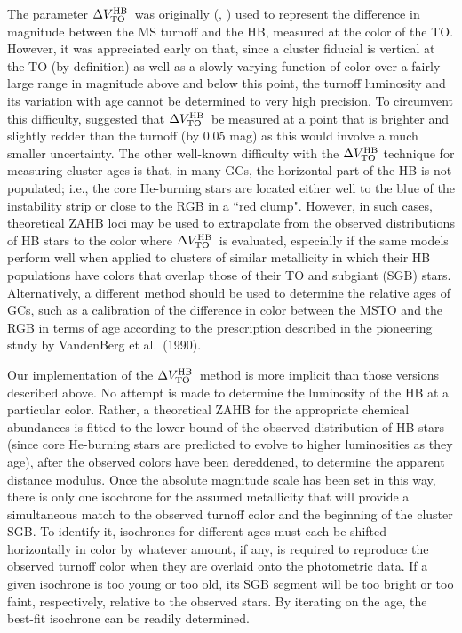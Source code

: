 \documentclass[12pt,preprint]{aastex}
\newcommand\delv{\Delta V^{\rm HB}_{\rm TO}}
\begin{document}
The parameter $\delv$\ was originally (\citealt{san82}, \citealt{ir84}) used to
represent the difference in magnitude between the MS turnoff and the HB,
measured at the color of the TO.  However, it was appreciated early on that,
since a cluster fiducial is vertical at the TO (by definition) as well as a
slowly varying function of color over a fairly large range in magnitude above
and below this point, the turnoff luminosity and its variation with age cannot
be determined to very high precision.  To circumvent this difficulty,
\citet{cdk96} suggested that $\delv$\ be measured at a point that is brighter
and slightly redder than the turnoff (by 0.05 mag) as this would involve a
much smaller uncertainty.  The other well-known difficulty with the $\delv$
technique for measuring cluster ages is that, in many GCs, the horizontal part
of the HB is not populated; i.e., the core He-burning stars are located either
well to the blue of the instability strip or close to the RGB in a ``red clump".
However, in such cases, theoretical ZAHB loci may be used to extrapolate from
the observed distributions of HB stars to the color where $\delv$\ is evaluated,
especially if the same models perform well when applied to clusters of similar
metallicity in which their HB populations have colors that overlap those of
their TO and subgiant (SGB) stars.  Alternatively, a different method should be
used to determine the relative ages of GCs, such as a calibration of the
difference in color between the MSTO and the RGB in terms of age according to
the prescription described in the pioneering study by VandenBerg et al.~(1990).

Our implementation of the $\delv$\ method is more implicit than those versions
described above.  No attempt is made to determine the luminosity of the HB at
a particular color.  Rather, a theoretical ZAHB for the appropriate chemical
abundances is fitted to the lower bound of the observed distribution of HB
stars (since core He-burning stars are predicted to evolve to higher
luminosities as they age), after the observed colors have been dereddened, to
determine the apparent distance modulus.  Once the absolute magnitude scale has
been set in this way, there is only one isochrone for the assumed metallicity 
that will provide a simultaneous match to the observed turnoff color and the
beginning of the cluster SGB.  To identify it, isochrones for different ages
must each be shifted horizontally in color by whatever amount, if any, is
required to reproduce the observed turnoff color when they are overlaid onto the
photometric data.  If a given isochrone is too young or too old, its SGB segment
will be too bright or too faint, respectively, relative to the observed stars.
By iterating on the age, the best-fit isochrone can be readily determined.
\end{document}
